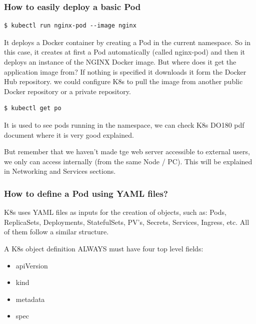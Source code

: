 \documentclass{article}
\newenvironment{blocktemplateIII}[1]{%
    \tcolorbox[beamer,%
    noparskip,breakable,
    ,colframe=Red,%
    colbacklower=LimeGreen!75!LightGreen,%
    title=#1]}%
    {\endtcolorbox}
\newenvironment{codetemplate}[1][]{%
  \mybasecolorbox[#1]
  \itshape
}{%
  \endmybasecolorbox
}
\begin{document}
\subsubsection{How to easily deploy a basic Pod}

\begin{codetemplate}{}
\begin{verbatim}
$ kubectl run nginx-pod --image nginx
\end{verbatim}
\end{codetemplate}

It deploys a Docker container by creating a Pod in the current namespace. So in this case, it creates at first a Pod automatically (called nginx-pod) and then it deploys an instance of the NGINX Docker image. But where does it get the application image from? If nothing is specified it downloads it form the Docker Hub repository. we could configure K8s to pull the image from another public Docker repository or a private repository.


\begin{codetemplate}{}
\begin{verbatim}
$ kubectl get po
\end{verbatim}
\end{codetemplate}

It is used to see pods running in the namespace, we can check K8s DO180 pdf document where it is very good explained.

But remember that we haven't made tge web server accessible to external users, we only can access internally (from the same Node / PC). This will be explained in Networking and Services sections.

\subsubsection{How to define a Pod using YAML files?}

K8s uses YAML files as inputs for the creation of objects, such as: Pods, ReplicaSets, Deployments, StatefulSets, PV's, Secrets, Services, Ingress, etc. All of them follow a similar structure.

\begin{blocktemplateIII}{Note}
A K8s object definition ALWAYS must have four top level fields:
\begin{itemize}
    \item apiVersion
    \item kind
    \item metadata
    \item spec
\end{itemize}
\end{blocktemplateIII}
\end{document}
